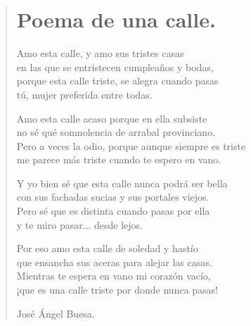 \documentclass[11pt, portrait, twoside, notitlepage, openright]{book}
\begin{document}
\newpage
\begin{verse}
\begin{center}
\section{Poema de una calle.}
\end{center}
Amo esta calle, y amo sus tristes casas\\
en las que se entristecen cumpleaños y bodas,\\
porque esta calle triste, se alegra cuando pasas\\
tú, mujer preferida entre todas.
\newline

Amo esta calle acaso porque en ella subsiste\\
no sé qué somnolencia de arrabal provinciano.\\
Pero a veces la odio, porque aunque siempre es triste\\
me parece más triste cuando te espero en vano.
\newline

Y yo bien sé que esta calle nunca podrá ser bella\\
con sus fachadas sucias y sus portales viejos.\\
Pero sé que es distinta cuando pasas por ella\\
y te miro pasar... desde lejos.
\newline

Por eso amo esta calle de soledad y hastío\\
que ensancha sus aceras para alejar las casas.\\
Mientras te espera en vano mi corazón vacío,\\
¡que es una calle triste por donde nunca pasas!
\newline

José Ángel Buesa.
\end{verse}
\end{document}
